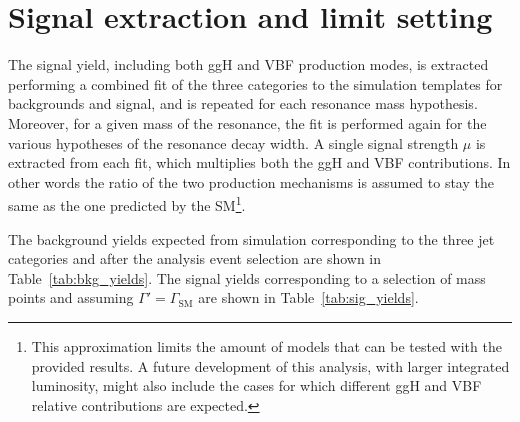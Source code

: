 \section{Signal extraction and limit setting}\label{chap6:SignalExtractionAndLimits}

The signal yield, including both ggH and VBF production modes, is extracted performing a combined fit of the three categories to the \mti simulation templates for backgrounds and signal, and is repeated for each resonance mass hypothesis. Moreover, for a given mass of the resonance, the fit is performed again for the various hypotheses of the resonance decay width. A single signal strength $\mu$ is extracted from each fit, which multiplies both the ggH and VBF contributions. In other words the ratio of the two production mechanisms is assumed to stay the same as the one predicted by the SM\footnote{This approximation limits the amount of models that can be tested with the provided results. A future development of this analysis, with larger integrated luminosity, might also include the cases for which different ggH and VBF relative contributions are expected.}.

The background yields expected from simulation corresponding to the three jet categories and after the analysis event selection are shown in Table~\ref{tab:bkg_yields}. The signal yields corresponding to a selection of mass points and assuming $\Gamma' = \Gamma_\mathrm{SM}$ are shown in Table~\ref{tab:sig_yields}.

